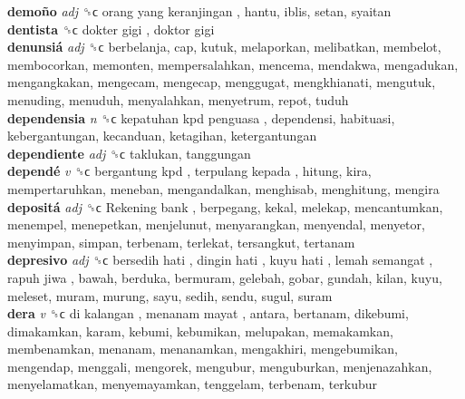 \textbf{demoño} \emph{adj}  ␝ϲ   orang yang keranjingan , hantu, iblis, setan, syaitan  \\
\textbf{dentista} ␝ϲ   dokter gigi ,  doktor gigi   \\
\textbf{denunsiá} \emph{adj}  ␝ϲ  berbelanja, cap, kutuk, melaporkan, melibatkan, membelot, membocorkan, memonten, mempersalahkan, mencema, mendakwa, mengadukan, mengangkakan, mengecam, mengecap, menggugat, mengkhianati, mengutuk, menuding, menuduh, menyalahkan, menyetrum, repot, tuduh  \\
\textbf{dependensia} \emph{n}  ␝ϲ   kepatuhan kpd penguasa , dependensi, habituasi, kebergantungan, kecanduan, ketagihan, ketergantungan  \\
\textbf{dependiente} \emph{adj}  ␝ϲ  taklukan, tanggungan  \\
\textbf{dependé} \emph{v}  ␝ϲ   bergantung kpd ,  terpulang kepada , hitung, kira, mempertaruhkan, meneban, mengandalkan, menghisab, menghitung, mengira  \\
\textbf{depositá} \emph{adj}  ␝ϲ   Rekening bank , berpegang, kekal, melekap, mencantumkan, menempel, menepetkan, menjelunut, menyarangkan, menyendal, menyetor, menyimpan, simpan, terbenam, terlekat, tersangkut, tertanam  \\
\textbf{depresivo} \emph{adj}  ␝ϲ   bersedih hati ,  dingin hati ,  kuyu hati ,  lemah semangat ,  rapuh jiwa , bawah, berduka, bermuram, gelebah, gobar, gundah, kilan, kuyu, meleset, muram, murung, sayu, sedih, sendu, sugul, suram  \\
\textbf{dera} \emph{v}  ␝ϲ   di kalangan ,  menanam mayat , antara, bertanam, dikebumi, dimakamkan, karam, kebumi, kebumikan, melupakan, memakamkan, membenamkan, menanam, menanamkan, mengakhiri, mengebumikan, mengendap, menggali, mengorek, mengubur, menguburkan, menjenazahkan, menyelamatkan, menyemayamkan, tenggelam, terbenam, terkubur  \\
